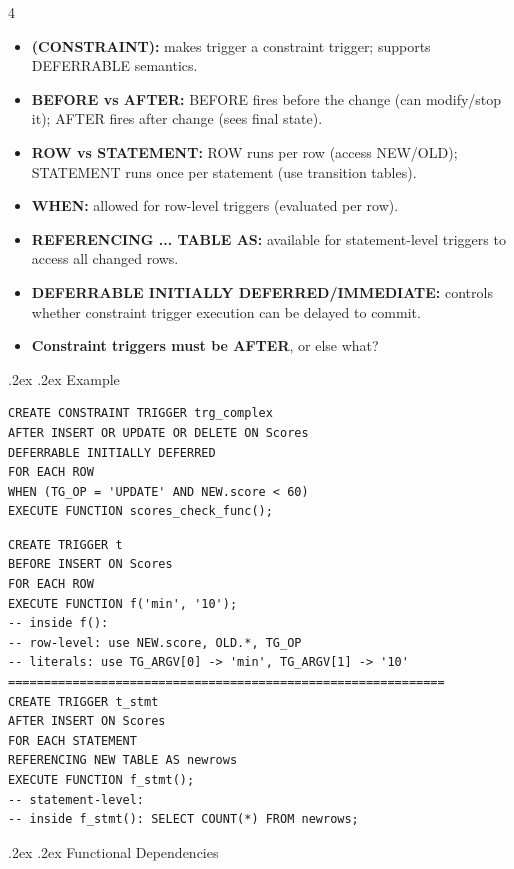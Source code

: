 \documentclass[10pt,landscape,a4paper]{article}
\makeatletter
\renewcommand{\section}{\@startsection{section}{1}{0mm}%
  {.2ex}%
  {.2ex}%
{\color{myblue}\sffamily\small\bfseries}}
\renewcommand{\subsection}{\@startsection{subsection}{1}{0mm}%
  {.2ex}%
  {.2ex}%
{\sffamily\bfseries}}
\makeatother
\begin{document}
\begin{multicols*}{4}
  \begin{itemize}[nosep]
    \item \textbf{(CONSTRAINT):} makes trigger a constraint trigger; supports DEFERRABLE semantics.
    \item \textbf{BEFORE vs AFTER:} BEFORE fires before the change (can modify/stop it); AFTER fires after change (sees final state).
    \item \textbf{ROW vs STATEMENT:} ROW runs per row (access NEW/OLD); STATEMENT runs once per statement (use transition tables).
    \item \textbf{WHEN:} allowed for row-level triggers (evaluated per row).
    \item \textbf{REFERENCING ... TABLE AS:} available for statement-level triggers to access all changed rows.
    \item \textbf{DEFERRABLE INITIALLY DEFERRED/IMMEDIATE:} controls whether constraint trigger execution can be delayed to commit.
    \item \textbf{Constraint triggers must be AFTER}, or else what?
  \end{itemize}
  \subsection{Example}
  \begin{verbatim}
CREATE CONSTRAINT TRIGGER trg_complex
AFTER INSERT OR UPDATE OR DELETE ON Scores
DEFERRABLE INITIALLY DEFERRED
FOR EACH ROW
WHEN (TG_OP = 'UPDATE' AND NEW.score < 60)
EXECUTE FUNCTION scores_check_func();
\end{verbatim}

  \begin{verbatim}
CREATE TRIGGER t 
BEFORE INSERT ON Scores 
FOR EACH ROW 
EXECUTE FUNCTION f('min', '10');
-- inside f(): 
-- row-level: use NEW.score, OLD.*, TG_OP
-- literals: use TG_ARGV[0] -> 'min', TG_ARGV[1] -> '10'
=============================================================
CREATE TRIGGER t_stmt 
AFTER INSERT ON Scores 
FOR EACH STATEMENT
REFERENCING NEW TABLE AS newrows  
EXECUTE FUNCTION f_stmt();
-- statement-level:
-- inside f_stmt(): SELECT COUNT(*) FROM newrows;
\end{verbatim}

  \section{Functional Dependencies}


\end{multicols*}
\end{document}
